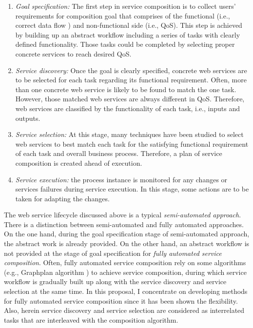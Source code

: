 \begin{enumerate}
 \item \textit{Goal specification:} The first step in service composition is to collect users' requirements for composition goal that comprises of the functional (i.e., correct data flow ) and non-functional side (i.e., QoS). This step is achieved by building up an abstract workflow including a series of tasks with clearly defined functionality. Those tasks could be completed by selecting proper concrete services to reach desired QoS. 
 \item \textit{Service discovery:} Once the goal is clearly specified, concrete web services are to be selected for each task regarding its functional requirement. Often, more than one concrete web service is likely to be found to match the one task. However,  those matched web services are always different in QoS.  Therefore, web services are classified by the functionality of each task, i.e., inputs and outputs.
 \item \textit{Service selection:} At this stage, many techniques have been studied to select web services to best match each task for the satisfying functional requirement of each task and overall business process. Therefore, a plan of service composition is created ahead of execution.

 \item \textit{Service execution:} the process instance is monitored for any changes or services failures during service execution. In this stage, some actions are to be taken for adapting the changes.
\end{enumerate}
The web service lifecycle discussed above is a typical \emph{semi-automated approach}. There is a distinction between semi-automated and fully automated approaches. On the one hand, during the goal specification stage of semi-automated approach, the abstract work is already provided.  On the other hand, an abstract workflow is not provided at the stage of goal specification for \emph{fully automated service composition}. Often, fully automated service composition rely on some algorithms (e.g., Graphplan algorithm \cite{blum1997fast}) to achieve service composition, during which service workflow is gradually built up along with the service discovery and service selection at the same time. In this proposal, I concentrate on developing methods for fully automated service composition since it has been shown the flexibility. Also, herein service discovery and service selection are considered as interrelated tasks that are interleaved with the composition algorithm.

